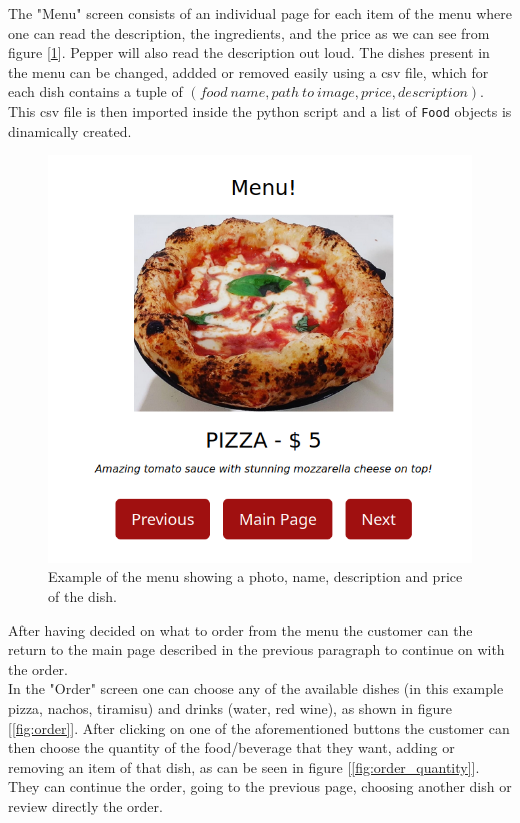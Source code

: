 \documentclass[12pt, letterpaper, twoside]{article}
\begin{document}
The "Menu" screen consists of an individual page for each item of the menu where one can read the description, the ingredients, and the price as we can see from figure [\ref{fig:menu}]. Pepper will also read the description out loud. The dishes present in the menu can be changed, addded or removed easily using a csv file, which for each dish contains a tuple of $(food\ name, path\ to\ image, price, description)$. This csv file is then imported inside the python script and a list of \verb|Food| objects is dinamically created.\\

\begin{figure}[h]
	\centerline{\includegraphics[scale=.4]{img/pizza.png}}
	\caption{Example of the menu showing a photo, name, description and price of the dish.}
	\label{fig:menu}
\end{figure}

\newpage

After having decided on what to order from the menu the customer can the return to the main page described in the previous paragraph to continue on with the order. \\
In the "Order" screen one can choose any of the available dishes (in this example pizza, nachos, tiramisu) and drinks (water, red wine), as shown in figure [\ref{fig:order}]. After clicking on one of the aforementioned	buttons the customer can then choose the quantity of the food/beverage that they want, adding or removing an item of that dish, as can be seen in figure [\ref{fig:order_quantity}]. They can continue the order, going to the previous page, choosing another dish or review directly the order.
\end{document}
